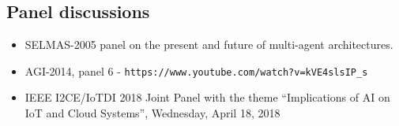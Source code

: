 
\subsection*{Panel discussions}

\begin{itemize}
\item SELMAS-2005 panel on the present and future of multi-agent architectures.

\item AGI-2014, panel 6 - \verb+https://www.youtube.com/watch?v=kVE4slsIP_s+

\item IEEE I2CE/IoTDI 2018 Joint Panel with the theme
``Implications of AI on IoT and Cloud Systems'', Wednesday, April 18, 2018

\end{itemize}
